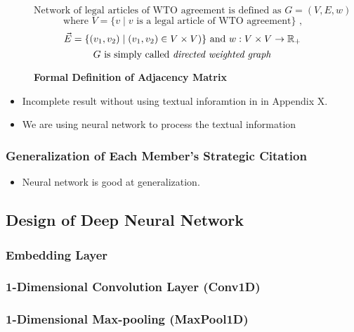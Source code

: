 \documentclass[12pt,letterpaper]{article}
\begin{document}


\begin{figure}[ht]
  \[\text{Network of legal articles of WTO agreement is defined as }  G = (V, E, w) \] 
  \[\text{ where } V = \{v \mid v\text{ is a legal article of WTO agreement}\}  \text{ , } \]
  \[\vec{E} = \{(v_1, v_2) \mid (v_1, v_2)\in V \times V)\} \text{ and }w : V \times V \to \Bbb R_{+} \]
  \[G\text{ is simply called \textit{directed weighted graph}}\]
  \caption{\textbf{Formal Definition of Adjacency Matrix}}
  \label{fig:adj}
  \end{figure}

\begin{itemize}
  \item Incomplete result without using textual inforamtion in in Appendix X.
  \item We are using neural network to process the textual information
\end{itemize}

\subsubsection{Generalization of Each Member's Strategic Citation}
\begin{itemize}
  \item Neural network is good at generalization.
\end{itemize}


\subsection{Design of Deep Neural Network}
\subsubsection{Embedding Layer}


\subsubsection{1-Dimensional Convolution Layer (Conv1D)}


\subsubsection{1-Dimensional Max-pooling (MaxPool1D)}


% 
\end{document}
